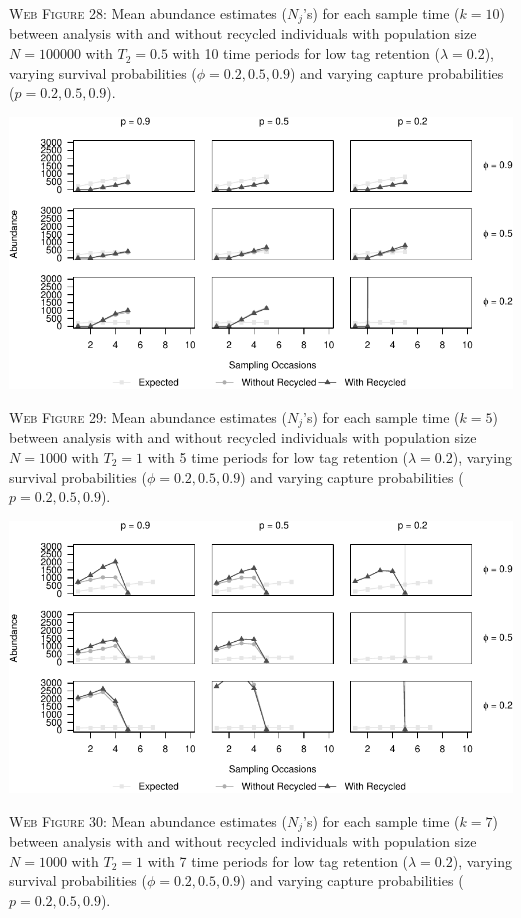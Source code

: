 \documentclass[]{article}
\begin{document}
\textsc{Web Figure 28:} Mean abundance estimates (\(N_j\)'s) for each
sample time (\(k=10\)) between analysis with and without recycled
individuals with population size \(N=100000\) with \(T_2=0.5\) with 10
time periods for low tag retention (\(\lambda=0.2\)), varying survival
probabilities (\(\phi=0.2,0.5,0.9\)) and varying capture probabilities
(\(p=0.2,0.5,0.9\)).

\newpage

\includegraphics{Appendix_BW_files/figure-latex/29_abundance_L_GJSTL5-1.pdf}

\textsc{Web Figure 29:} Mean abundance estimates (\(N_j\)'s) for each
sample time (\(k=5\)) between analysis with and without recycled
individuals with population size \(N=1000\) with \(T_2=1\) with 5 time
periods for low tag retention (\(\lambda=0.2\)), varying survival
probabilities (\(\phi=0.2,0.5,0.9\)) and varying capture probabilities
(\(p=0.2,0.5,0.9\)).

\includegraphics{Appendix_BW_files/figure-latex/30_abundance_L_GJSTL6-1.pdf}

\textsc{Web Figure 30:} Mean abundance estimates (\(N_j\)'s) for each
sample time (\(k=7\)) between analysis with and without recycled
individuals with population size \(N=1000\) with \(T_2=1\) with 7 time
periods for low tag retention (\(\lambda=0.2\)), varying survival
probabilities (\(\phi=0.2,0.5,0.9\)) and varying capture probabilities
(\(p=0.2,0.5,0.9\)).
\end{document}
